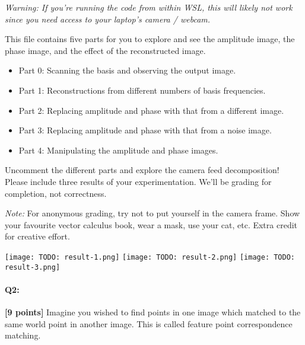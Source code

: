 \textit{Warning: If you're running the code from within WSL, this will likely not work since you need access to your laptop's camera / webcam.}

This file contains five parts for you to explore and see the amplitude image, the phase image, and the effect of the reconstructed image.
\begin{itemize}
    \item Part 0: Scanning the basis and observing the output image.
    \item Part 1: Reconstructions from different numbers of basis frequencies.
    \item Part 2: Replacing amplitude and phase with that from a different image.
    \item Part 3: Replacing amplitude and phase with that from a noise image.
    \item Part 4: Manipulating the amplitude and phase images.
\end{itemize}

Uncomment the different parts and explore the camera feed decomposition! Please include three results of your experimentation. We'll be grading for completion, not correctness.

\emph{Note:} For anonymous grading, try not to put yourself in the camera frame. Show your favourite vector calculus book, wear a mask, use your cat, etc. Extra credit for creative effort.

\texttt{[image: TODO: result-1.png]}
\texttt{[image: TODO: result-2.png]}
\texttt{[image: TODO: result-3.png]}










\pagebreak

\paragraph{Q2:} \textbf{[9 points]} Imagine you wished to find points in one image which matched to the same world point in another image. This is called feature point correspondence matching.

